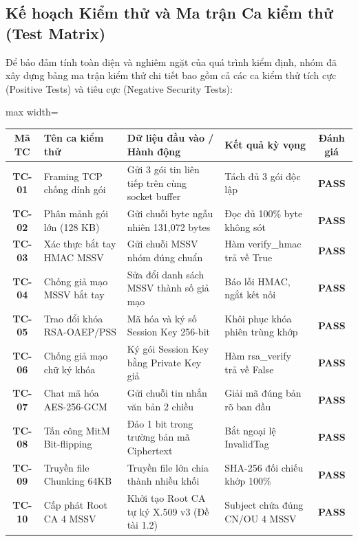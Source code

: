 \documentclass[a4paper,12pt]{article}
\renewcommand{\arraystretch}{1.2}
\begin{document}
\subsection{Kế hoạch Kiểm thử và Ma trận Ca kiểm thử (Test Matrix)}
Để bảo đảm tính toàn diện và nghiêm ngặt của quá trình kiểm định, nhóm đã xây dựng bảng ma trận kiểm thử chi tiết bao gồm cả các ca kiểm thử tích cực (Positive Tests) và tiêu cực (Negative Security Tests):

\begin{table}[H]
\centering
\renewcommand{\arraystretch}{1.2}
\begin{adjustbox}{max width=\textwidth}
\begin{tabular}{|c|l|p{6cm}|l|c|}
\hline
\textbf{Mã TC} & \textbf{Tên ca kiểm thử} & \textbf{Dữ liệu đầu vào / Hành động} & \textbf{Kết quả kỳ vọng} & \textbf{Đánh giá} \\ \hline
\textbf{TC-01} & Framing TCP chống dính gói & Gửi 3 gói tin liên tiếp trên cùng socket buffer & Tách đủ 3 gói độc lập & \textbf{PASS} \\ \hline
\textbf{TC-02} & Phân mảnh gói lớn (128 KB) & Gửi chuỗi byte ngẫu nhiên 131,072 bytes & Đọc đủ 100\% byte không sót & \textbf{PASS} \\ \hline
\textbf{TC-03} & Xác thực bắt tay HMAC MSSV & Gửi chuỗi MSSV nhóm đúng chuẩn & Hàm verify\_hmac trả về True & \textbf{PASS} \\ \hline
\textbf{TC-04} & Chống giả mạo MSSV bắt tay & Sửa đổi danh sách MSSV thành số giả mạo & Báo lỗi HMAC, ngắt kết nối & \textbf{PASS} \\ \hline
\textbf{TC-05} & Trao đổi khóa RSA-OAEP/PSS & Mã hóa và ký số Session Key 256-bit & Khôi phục khóa phiên trùng khớp & \textbf{PASS} \\ \hline
\textbf{TC-06} & Chống giả mạo chữ ký khóa & Ký gói Session Key bằng Private Key giả & Hàm rsa\_verify trả về False & \textbf{PASS} \\ \hline
\textbf{TC-07} & Chat mã hóa AES-256-GCM & Gửi chuỗi tin nhắn văn bản 2 chiều & Giải mã đúng bản rõ ban đầu & \textbf{PASS} \\ \hline
\textbf{TC-08} & Tấn công MitM Bit-flipping & Đảo 1 bit trong trường bản mã Ciphertext & Bắt ngoại lệ InvalidTag & \textbf{PASS} \\ \hline
\textbf{TC-09} & Truyền file Chunking 64KB & Truyền file lớn chia thành nhiều khối & SHA-256 đối chiếu khớp 100\% & \textbf{PASS} \\ \hline
\textbf{TC-10} & Cấp phát Root CA 4 MSSV & Khởi tạo Root CA tự ký X.509 v3 (Đề tài 1.2) & Subject chứa đúng CN/OU 4 MSSV & \textbf{PASS} \\ \hline

\end{tabular}
\end{adjustbox}
\end{table}
\end{document}
